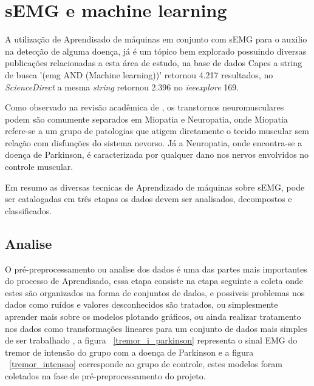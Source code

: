 \section{sEMG e machine learning}
A utilização de Aprendisado de máquinas em conjunto com sEMG para o auxilio na detecção de alguma doença, já é um tópico bem explorado possuindo diversas publicações relacionadas a esta área de estudo, na base de dados Capes a string de busca '(emg AND (Machine learning))' retornou 4.217 resultados, no \textit{ScienceDirect} a mesma \textit{string} retornou 2.396 no \textit{ieeexplore} 169.

Como observado na revisão acadêmica de \cite{yousefi2014characterizing}, os transtornos neuromusculares podem são comumente separados em Miopatia e Neuropatia, onde Miopatia refere-se a um grupo de patologias que atigem diretamente o tecido muscular sem relação com disfunções do sistema nevorso. Já a Neuropatia, onde encontra-se a doença de Parkinson, é caracterizada por qualquer dano nos nervos envolvidos no controle muscular.

Em resumo as diversas tecnicas de Aprendizado de máquinas sobre sEMG, pode ser catalogadas em três etapas os dados devem ser analisados, decompostos e classificados\cite{yousefi2014characterizing}.

\subsection{Analise}
O pré-preprocessamento ou analise dos dados é uma das partes mais importantes do processo de Aprendisado, essa etapa consiste na etapa seguinte a coleta onde estes são organizados na forma de conjuntos de dados, e possiveis problemas nos dados como ruídos e valores desconhecidos são tratados, ou simplesmente aprender mais sobre os modelos plotando gráficos, ou ainda realizar tratamento nos dados como transformações lineares para um conjunto de dados mais simples de ser trabalhado \cite{batista2003pre}, a figura ~\ref{tremor_i_parkinson} representa o sinal EMG do tremor de intensão do grupo com a doença de Parkinson e  a figura ~\ref{tremor_intensao} corresponde ao grupo de controle, estes modelos foram coletados na fase de pré-preprocessamento do projeto. 


